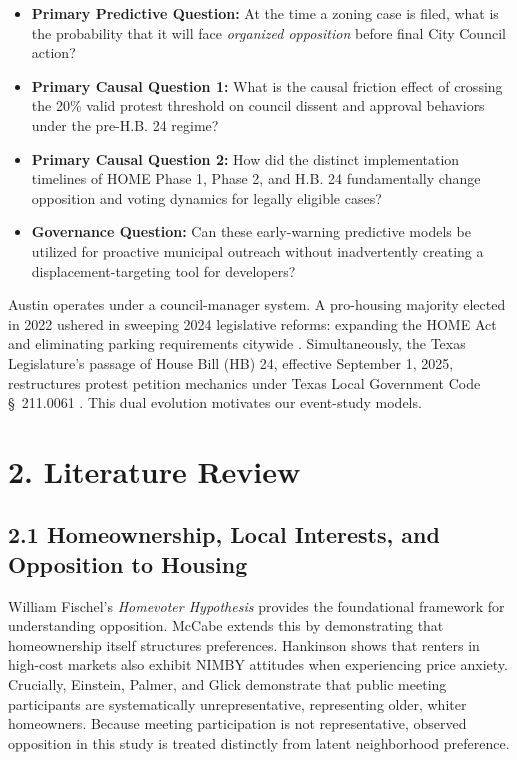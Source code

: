 \begin{itemize}
    \item \textbf{Primary Predictive Question:} At the time a zoning case is filed, what is the probability that it will face \textit{organized opposition} before final City Council action?
    \item \textbf{Primary Causal Question 1:} What is the causal friction effect of crossing the 20\% valid protest threshold on council dissent and approval behaviors under the pre-H.B. 24 regime?
    \item \textbf{Primary Causal Question 2:} How did the distinct implementation timelines of HOME Phase 1, Phase 2, and H.B. 24 fundamentally change opposition and voting dynamics for legally eligible cases?
    \item \textbf{Governance Question:} Can these early-warning predictive models be utilized for proactive municipal outreach without inadvertently creating a displacement-targeting tool for developers?
\end{itemize}

Austin operates under a council-manager system. A pro-housing majority elected in 2022 ushered in sweeping 2024 legislative reforms: expanding the HOME Act and eliminating parking requirements citywide \cite{axios2023parking}. Simultaneously, the Texas Legislature's passage of House Bill (HB) 24, effective September 1, 2025, restructures protest petition mechanics under Texas Local Government Code \S~211.0061 \cite{hb24_2025}. This dual evolution motivates our event-study models.

\section*{2. Literature Review}

\subsection*{2.1 Homeownership, Local Interests, and Opposition to Housing}
William Fischel's \textit{Homevoter Hypothesis} \cite{fischel2001homevoter} provides the foundational framework for understanding opposition. McCabe \cite{mccabe2016} extends this by demonstrating that homeownership itself structures preferences. Hankinson \cite{hankinson2018} shows that renters in high-cost markets also exhibit NIMBY attitudes when experiencing price anxiety. Crucially, Einstein, Palmer, and Glick \cite{einstein2019} demonstrate that public meeting participants are systematically unrepresentative, representing older, whiter homeowners. Because meeting participation is not representative, observed opposition in this study is treated distinctly from latent neighborhood preference.

